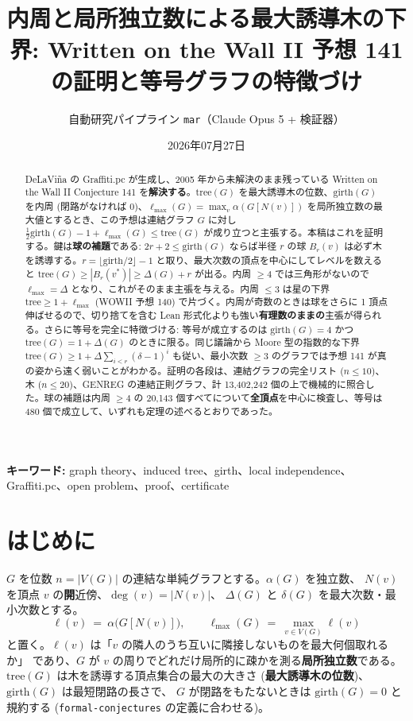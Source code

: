 \documentclass[paper=a4,fontsize=10.5pt,jafontsize=10.5pt]{jlreq}
\title{内周と局所独立数による最大誘導木の下界: Written on the Wall II 予想 141 の証明と等号グラフの特徴づけ}
\author{自動研究パイプライン \texttt{mar}（Claude Opus 5 + 検証器）}
\date{2026年07月27日}
\theoremstyle{plain}
\theoremstyle{definition}
\begin{document}
\maketitle

\begin{abstract}
DeLaViña の Graffiti.pc が生成し、2005 年から未解決のまま残っている Written on the Wall II Conjecture 141 を\textbf{解決する}。$\mathrm{tree}(G)$ を最大誘導木の位数、$\mathrm{girth}(G)$ を内周 (閉路がなければ $0$)、$\ell_{\max}(G) = \max_v \alpha(G[N(v)])$ を局所独立数の最大値とするとき、この予想は連結グラフ $G$ に対し $\tfrac{1}{2}\mathrm{girth}(G) - 1 + \ell_{\max}(G) \le \mathrm{tree}(G)$ が成り立つと主張する。本稿はこれを証明する。鍵は\textbf{球の補題}である: $2r + 2 \le \mathrm{girth}(G)$ ならば半径 $r$ の球 $B_r(v)$ は必ず木を誘導する。$r = \lfloor \mathrm{girth}/2 \rfloor - 1$ と取り、最大次数の頂点を中心にしてレベルを数えると $\mathrm{tree}(G) \ge |B_r(v^*)| \ge \Delta(G) + r$ が出る。内周 $\ge 4$ では三角形がないので $\ell_{\max} = \Delta$ となり、これがそのまま主張を与える。内周 $\le 3$ は星の下界 $\mathrm{tree} \ge 1 + \ell_{\max}$ (WOWII 予想 140) で片づく。内周が奇数のときは球をさらに 1 頂点伸ばせるので、切り捨てを含む Lean 形式化よりも強い\textbf{有理数のままの}主張が得られる。さらに等号を完全に特徴づける: 等号が成立するのは $\mathrm{girth}(G) = 4$ かつ $\mathrm{tree}(G) = 1 + \Delta(G)$ のときに限る。同じ議論から Moore 型の指数的な下界 $\mathrm{tree}(G) \ge 1 + \Delta \sum_{i<r} (\delta-1)^i$ も従い、最小次数 $\ge 3$ のグラフでは予想 141 が真の姿から遠く弱いことがわかる。証明の各段は、連結グラフの完全リスト ($n \le 10$)、木 ($n \le 20$)、GENREG の連結正則グラフ、計 13,402,242 個の上で機械的に照合した。球の補題は内周 $\ge 4$ の 20,143 個すべてについて\textbf{全頂点}を中心に検査し、等号は 480 個で成立して、いずれも定理の述べるとおりであった。
\end{abstract}

\noindent\textbf{キーワード:} graph theory、induced tree、girth、local independence、Graffiti.pc、open problem、proof、certificate


\section{はじめに}

$G$ を位数 $n = |V(G)|$ の連結な単純グラフとする。$\alpha(G)$ を独立数、
$N(v)$ を頂点 $v$ の\textbf{開}近傍、$\deg(v) = |N(v)|$、
$\Delta(G)$ と $\delta(G)$ を最大次数・最小次数とする。
\[ \ell(v) \ = \ \alpha\bigl(G[N(v)]\bigr), \qquad
   \ell_{\max}(G) \ = \ \max_{v \in V(G)} \ell(v) \]
と置く。$\ell(v)$ は「$v$ の隣人のうち互いに隣接しないものを最大何個取れるか」
であり、$G$ が $v$ の周りでどれだけ局所的に疎かを測る\textbf{局所独立数}である。
$\mathrm{tree}(G)$ は木を誘導する頂点集合の最大の大きさ
(\textbf{最大誘導木の位数})、$\mathrm{girth}(G)$ は最短閉路の長さで、
$G$ が閉路をもたないときは $\mathrm{girth}(G) = 0$ と規約する
(\texttt{formal-conjectures} \cite{formalconj} の定義に合わせる)。
\end{document}
